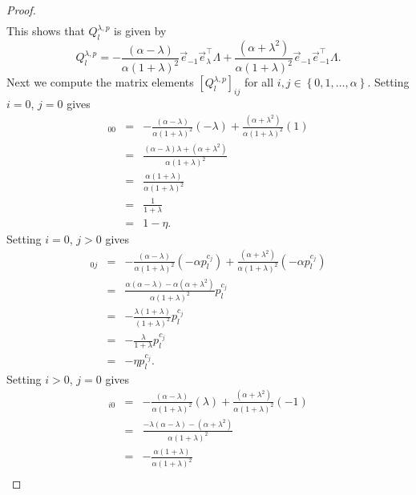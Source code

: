 \documentclass{article}
\numberwithin{myclaim}{section}
\newcommand{\set}[1]{\left\{ #1 \right\}}
\begin{document}
\begin{proof}
\begin{eqnarray}
\end{eqnarray}
This shows that $Q_l^{\lambda,p}$ is given by
\begin{equation}
    Q_l^{\lambda,p} = - \frac{(\alpha - \lambda)}{\alpha(1+\lambda)^2} \vec{e}_{-1} \vec{e}_\lambda^\top \Lambda  + \frac{(\alpha + \lambda^2)}{\alpha(1+\lambda)^2} \vec{e}_{-1}\vec{e}_{-1}^\top \Lambda.
\end{equation}
Next we compute the matrix elements $[Q_l^{\lambda,p}]_{ij}$ for all $i,j \in \set{0, 1, \ldots, \alpha}$. %
Setting $i =0$, $j = 0$ gives
\begin{eqnarray}
    [Q_l^{\lambda,p}]_{00} &=& - \frac{(\alpha - \lambda)}{\alpha(1+\lambda)^2} (-\lambda)  + \frac{(\alpha + \lambda^2)}{\alpha(1+\lambda)^2} (1) \\
    &=& \frac{(\alpha-\lambda)\lambda + (\alpha + \lambda^2)}{\alpha(1+\lambda)^2} \\
    &=& \frac{\alpha(1 + \lambda)}{\alpha(1+\lambda)^2} \\
    &=& \frac{1}{1+\lambda} \\
    &=& 1 - \eta.
\end{eqnarray}
Setting $i=0$, $j>0$ gives
\begin{eqnarray}
    [Q_l^{\lambda,p}]_{0j} &=& - \frac{(\alpha - \lambda)}{\alpha(1+\lambda)^2} (- \alpha p_l^{c_j})  + \frac{(\alpha + \lambda^2)}{\alpha(1+\lambda)^2} (- \alpha p_l^{c_j}) \\
    &=& \frac{\alpha (\alpha - \lambda) - \alpha (\alpha + \lambda^2)}{\alpha (1+\lambda)^2} p_l^{c_j} \\
    &=& - \frac{\lambda( 1 + \lambda)}{(1+\lambda)^2} p_l^{c_j} \\
    &=& - \frac{\lambda}{1 + \lambda} p_l^{c_j} \\
    &=& - \eta p_l^{c_j}.
\end{eqnarray}
Setting $i>0$, $j=0$ gives
\begin{eqnarray}
    [Q_l^{\lambda,p}]_{i0} &=& - \frac{(\alpha - \lambda)}{\alpha(1+\lambda)^2} (\lambda)  + \frac{(\alpha + \lambda^2)}{\alpha(1+\lambda)^2} (-1) \\
    &=& \frac{-\lambda(\alpha - \lambda) - (\alpha + \lambda^2)}{\alpha(1+\lambda)^2} \\
    &=& - \frac{\alpha( 1 + \lambda)}{\alpha(1+\lambda)^2}  \\

\end{eqnarray}
\end{proof}
\end{document}
